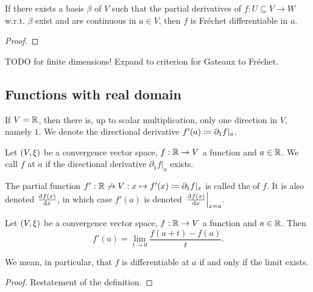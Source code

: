 \begin{proposition}
If there exists a basis $\beta$ of $V$ such that the partial derivatives of $f:U\subseteq V\to W$ w.r.t. $\beta$ exist and are continuous in $a\in V$, then $f$ is Fréchet differentiable in $a$.
\end{proposition}
\begin{proof}

\end{proof}
TODO for finite dimensions! Expand to criterion for Gateaux to Fréchet.
\begin{example}

\end{example}

\subsection{Functions with real domain}
If $V = \mathbb{R}$, then there is, up to scalar multiplication, only one direction in $V$, namely $1$. We denote the directional derivative $f'(a) \coloneqq \partial_1 f|_a$.


\begin{definition}
Let $\sSet{V,\xi}$ be a convergence vector space, $f: \mathbb{R} \to V$ a function and $a\in \mathbb{R}$. We call $f$  at $a$ if the directional derivative $\partial_1f|_a$ exists.

The partial function $f': \mathbb{R}\not\to V: x\mapsto f'(x) \coloneqq \partial_1f|_x$ is called the  of $f$. It is also denoted $\od{f(x)}{x}$, in which case $f'(a)$ is denoted $\left.\od{f(x)}{x}\right|_{x=a}$.
\end{definition}

\begin{lemma} \label{elementaryRealDomainDerivative}
Let $\sSet{V,\xi}$ be a convergence vector space, $f: \mathbb{R} \to V$ a function and $a\in \mathbb{R}$. Then
\[ f'(a) = \lim_{t\to 0} \frac{f(a+t) - f(a)}{t}. \]
\end{lemma}
We mean, in particular, that $f$ is differentiable at $a$ if and only if the limit exists.
\begin{proof}
Restatement of the definition.
\end{proof}

